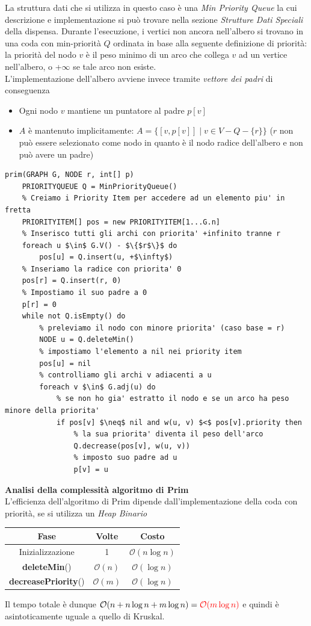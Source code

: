\documentclass[../cheatSheetAlgoritmi.tex]{subfiles}
\begin{document}
La struttura dati che si utilizza in questo caso è una \emph{Min Priority Queue} la cui descrizione e implementazione si può trovare nella sezione \emph{Strutture Dati Speciali} della dispensa. Durante l'esecuzione, i vertici non ancora nell'albero si trovano in una coda con min-priorità $Q$ ordinata in base alla seguente definizione di priorità: la priorità del nodo $v$ è il peso minimo di un arco che collega $v$ ad un vertice nell'albero, o +$\infty$ se tale arco non esiste.\\
L'implementazione dell'albero avviene invece tramite \emph{vettore dei padri} di conseguenza
\begin{itemize}
	\item Ogni nodo $v$ mantiene un puntatore al padre $p[v]$
	\item $A$ è mantenuto implicitamente: $A = \{[v, p[v]] \mid v \in V - Q - \{r\}\}$ ($r$ non può essere selezionato come nodo in quanto è il nodo radice dell'albero e non può avere un padre)
\end{itemize}
\begin{lstlisting}[caption=Albero di Copertura di Peso Minimo - Prim]
prim(GRAPH G, NODE r, int[] p)
	PRIORITYQUEUE Q = MinPriorityQueue()
	% Creiamo i Priority Item per accedere ad un elemento piu' in fretta
	PRIORITYITEM[] pos = new PRIORITYITEM[1...G.n]
	% Inserisco tutti gli archi con priorita' +infinito tranne r
	foreach u $\in$ G.V() - $\{$r$\}$ do
		pos[u] = Q.insert(u, +$\infty$)
	% Inseriamo la radice con priorita' 0
	pos[r] = Q.insert(r, 0)
	% Impostiamo il suo padre a 0
	p[r] = 0
	while not Q.isEmpty() do
		% preleviamo il nodo con minore priorita' (caso base = r)
		NODE u = Q.deleteMin()
		% impostiamo l'elemento a nil nei priority item
		pos[u] = nil
		% controlliamo gli archi v adiacenti a u
		foreach v $\in$ G.adj(u) do
			% se non ho gia' estratto il nodo e se un arco ha peso minore della priorita' 
			if pos[v] $\neq$ nil and w(u, v) $<$ pos[v].priority then
				% la sua priorita' diventa il peso dell'arco
				Q.decrease(pos[v], w(u, v))
				% imposto suo padre ad u
				p[v] = u
\end{lstlisting}
\textbf{Analisi della complessità algoritmo di Prim}\\
L'efficienza dell'algoritmo di Prim dipende dall'implementazione della coda con priorità, se si utilizza un \emph{Heap Binario}
\begin{center}
	\renewcommand{\arraystretch}{1.2}
	\begin{tabular}{ |c|c|c| } 
		\hline
			\textbf{Fase} & \textbf{Volte} & \textbf{Costo}\\ 
		\hline
			Inizializzazione & 1 &  $\mathcal{O}(n \log n)$\\ 
		\hline
			\textbf{deleteMin}() & $\mathcal{O}(n)$ &  $\mathcal{O}(\log n)$ \\
		\hline
			\textbf{decreasePriority}() & $\mathcal{O}(m)$ & $\mathcal{O}(\log n)$\\
		\hline
	\end{tabular}
\end{center}
Il tempo totale è dunque $\mathcal{O}(n + n \log n + m \log n) = \textcolor{red}{\mathcal{O}(m \log n)}$ e quindi è asintoticamente uguale a quello di Kruskal.
\end{document}
